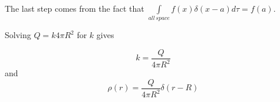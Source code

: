 \documentclass[12pt, oneside]{article}   	%
\begin{document}
The last step comes from the fact that $\int\limits_{all \,space} f(x)\delta(x-a)d\tau=f(a)$. 

Solving $Q=k4\pi R^2$ for $k$ gives

\begin{equation}
k=\frac{Q}{4\pi R^2}
\end{equation}
and
\begin{equation}
\boxed{ \rho(r)=\frac{Q}{4\pi R^2}\delta(r-R)}
\end{equation}
\end{document}
